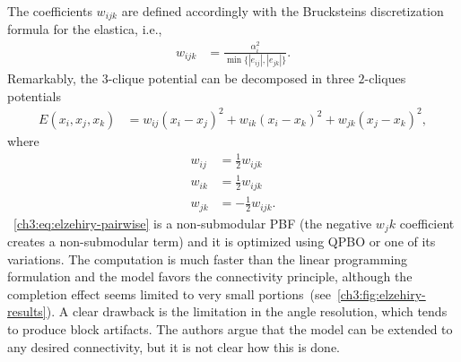 The coefficients $w_{ijk}$ are defined accordingly with the Brucksteins discretization formula for the elastica, i.e.,
\begin{align*}
	w_{ijk} &= \frac{ \alpha_i ^2}{\min \{ |e_{ij}|,|e_{jk}| \} }.
\end{align*}
%
Remarkably, the $3$-clique potential can be decomposed in three $2$-cliques potentials 
\begin{align}
	E(x_i,x_j,x_k) &= w_{ij}(x_i-x_j)^2 + w_{ik}(x_i-x_k)^2 + w_{jk}(x_j-x_k)^2,
	\label{ch3:eq:elzehiry-pairwise}
\end{align}
%
where
\begin{align*}
	w_{ij} &= \frac{1}{2}w_{ijk} \\
	w_{ik} &= \frac{1}{2}w_{ijk} \\	
	w_{jk} &= -\frac{1}{2}w_{ijk}.
\end{align*}
%
~\cref{ch3:eq:elzehiry-pairwise} is a non-submodular PBF (the negative $w_jk$ coefficient creates a non-submodular term) and it is optimized using QPBO or one of its variations. The computation is much faster than the linear programming formulation and the model favors the connectivity principle, although the completion effect seems limited to very small portions~(see~\cref{ch3:fig:elzehiry-results}). A clear drawback is the limitation in the angle resolution, which tends to produce block artifacts. The authors argue that the model can be extended to any desired connectivity, but it is not clear how this is done.

